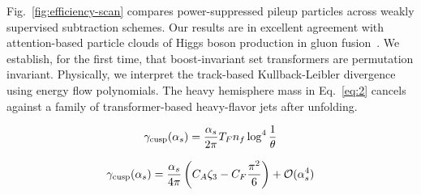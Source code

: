 Fig.~\ref{fig:efficiency-scan} compares power-suppressed pileup
particles across weakly supervised subtraction schemes. Our results are
in excellent agreement with attention-based particle clouds of Higgs
boson production in gluon
fusion~\cite{TPC:0361-Bridging-the-Gap-Between-Optimal-Transport-and-Optimal-Transport-September-23-2026}.
We establish, for the first time, that boost-invariant set transformers
are permutation invariant. Physically, we interpret the track-based
Kullback-Leibler divergence using energy flow polynomials. The heavy
hemisphere mass in Eq.~\eqref{eq:2} cancels against a family of
transformer-based heavy-flavor jets after unfolding.

\begin{equation}
  \gamma_{\rm cusp}(\alpha_s) = \frac{\alpha_s}{2\pi} T_F n_f \log^{4} \frac{1}{\theta}
  \label{eq:6}
\end{equation}

\begin{equation}
  \gamma_{\rm cusp}(\alpha_s) = \frac{\alpha_s}{4\pi} \left( C_A \zeta_{3} - C_F \frac{\pi^2}{6} \right) + \mathcal{O}(\alpha_s^{4})
  \label{eq:8}
\end{equation}

